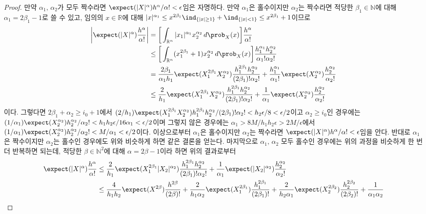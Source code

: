 \begin{proof}
    만약 $\alpha_1,\,\alpha_2$가 모두 짝수라면 $\expect(|X|^\alpha)h^\alpha/\alpha!<\epsilon$임은 자명하다. 만약 $\alpha_1$은 홀수이지만 $\alpha_2$는 짝수라면 적당한 $\beta_1\in\mathbb{N}$에 대해 $\alpha_1=2\beta_1-1$로 쓸 수 있고, 임의의 $x\in\mathbb{R}$에 대해 $|x|^{\alpha_1}\leq x^{2\beta_1}\ind_{\{|x|\geq1\}}+\ind_{\{|x|<1\}}\leq x^{2\beta_1}+1$이므로
    \begin{align*}
        \bigg|\expect(|X|^\alpha)\frac{h^\alpha}{\alpha!}\bigg|&=\bigg[\int_{\mathbb{R}^n}|x_1|^{\alpha_1}x_2^{\alpha_2}\,d\prob_X(x)\bigg]\frac{h^\alpha}{\alpha!}\\
        &\leq\bigg[\int_{\mathbb{R}^n}(x_1^{2\beta_1}+1)x_2^{\alpha_2}\,d\prob_X(x)\bigg]\frac{h_1^{\alpha_1}h_2^{\alpha_2}}{\alpha_1!\alpha_2!}\\
        &=\frac{2\beta_1}{\alpha_1h_1}\expect(X_1^{2\beta_1}X_2^{\alpha_2})\frac{h_1^{2\beta_1}h_2^{\alpha_2}}{(2\beta_1)!\alpha_2!}+\frac{h_1^{\alpha_1}}{\alpha_1!}\expect(X_2^{\alpha_2})\frac{h_2^{\alpha_2}}{\alpha_2!}\\
        &\leq\frac{2}{h_1}\expect(X_1^{2\beta_1}X_2^{\alpha_2})\frac{h_1^{2\beta_1}h_2^{\alpha_2}}{(2\beta_1)!\alpha_2!}+\frac{1}{\alpha_1}\expect(X_2^{\alpha_2})\frac{h_2^{\alpha_2}}{\alpha_2!}
    \end{align*}
    이다. 그렇다면 $2\beta_1+\alpha_2\geq i_0+1$에서 $(2/h_1)\expect(X_1^{2\beta_1}X_2^{\alpha_2})h_1^{2\beta_1}h_2^{\alpha_2}/(2\beta_1)!\alpha_2!<h_2\epsilon/8<\epsilon/2$이고 $\alpha_2\geq i_0$인 경우에는 $(1/\alpha_1)\expect(X_2^{\alpha_2})h_2^{\alpha_2}/\alpha_2!<h_1h_2\epsilon/16\alpha_1<\epsilon/2$이며 그렇지 않은 경우에는 $\alpha_1>8M/h_1h_2\epsilon>2M/\epsilon$에서 $(1/\alpha_1)\expect(X_2^{\alpha_2})h_2^{\alpha_2}/\alpha_2!<M/\alpha_1<\epsilon/2$이다. 이상으로부터 $\alpha_1$은 홀수이지만 $\alpha_2$는 짝수라면 $\expect(|X|^\alpha)h^\alpha/\alpha!<\epsilon$임을 안다. 반대로 $\alpha_1$은 짝수이지만 $\alpha_2$는 홀수인 경우에도 위와 비슷하게 하면 같은 결론을 얻는다. 마지막으로 $\alpha_1,\,\alpha_2$ 모두 홀수인 경우에는 위의 과정을 비슷하게 한 번 더 반복하면 되는데, 적당한 $\beta\in\mathbb{N}^2$에 대해 $\alpha=2\beta-1$이라 하면 위의 결과로부터
    \begin{align*}
        \expect(|X|^\alpha)\frac{h^\alpha}{\alpha!}&\leq\frac{2}{h_1}\expect(X_1^{2\beta_1}|X_2|^{\alpha_2})\frac{h_1^{2\beta_1}h_2^{\alpha_2}}{(2\beta_1)!\alpha_2!}+\frac{1}{\alpha_1}\expect(|X_2|^{\alpha_2})\frac{h_2^{\alpha_2}}{\alpha_2!}\\
        &\leq\frac{4}{h_1h_2}\expect(X^{2\beta})\frac{h^{2\beta}}{(2\beta)!}+\frac{2}{h_1\alpha_2}\expect(X_1^{2\beta_1})\frac{h_1^{2\beta_1}}{(2\beta_1)!}+\frac{2}{h_2\alpha_1}\expect(X_2^{2\beta_2})\frac{h_2^{2\beta_2}}{(2\beta_2)!}+\frac{1}{\alpha_1\alpha_2}

\end{align*}
\end{proof}
